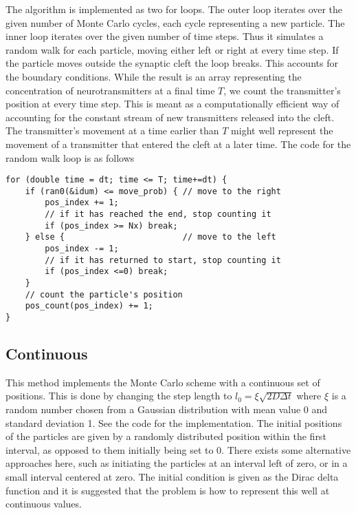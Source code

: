\documentclass[norsk,a4paper,11pt]{article}
\begin{document}
The algorithm is implemented as two for loops. The outer loop iterates over
the given number of Monte Carlo cycles, each cycle representing a new particle.
The inner loop iterates over the given number of time steps. Thus it simulates
a random walk for each particle, moving either left or right at every time step.
If the particle moves outside the synaptic cleft the loop breaks. This accounts
for the boundary conditions.
While the result is an array representing the concentration of neurotransmitters
at a final time $T$, we count the transmitter's position at every time step.
This is meant as a computationally efficient way of accounting for the constant
stream of new transmitters released into the cleft. The transmitter's movement
at a time earlier than $T$ might well represent the movement of a transmitter
that entered the cleft at a later time. The code for the random walk loop
is as follows
\begin{lstlisting}
for (double time = dt; time <= T; time+=dt) {
    if (ran0(&idum) <= move_prob) { // move to the right
        pos_index += 1;                
        // if it has reached the end, stop counting it
        if (pos_index >= Nx) break;
    } else {                        // move to the left
        pos_index -= 1;
        // if it has returned to start, stop counting it
        if (pos_index <=0) break;
    }
    // count the particle's position
    pos_count(pos_index) += 1;
}
\end{lstlisting}

\subsection{Continuous}
This method implements the Monte Carlo scheme with a continuous set of positions.
This is done by changing the step length to $l_0=\xi \sqrt{2D\Delta t}$ where $\xi$
is a random number chosen from a Gaussian distribution with mean value 0 and standard
deviation 1. See the code for the implementation. The initial positions of the particles
are given by a randomly distributed position within the first interval, as opposed to them
initially being set to 0. There exists some alternative approaches here, such as initiating
the particles at an interval left of zero, or in a small interval centered at zero.
The initial condition is given as the Dirac delta function and it is suggested that the problem
is how to represent this well at continuous values.
\end{document}

